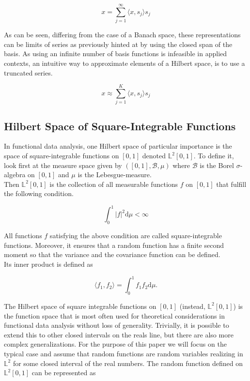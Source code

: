 \documentclass[11pt,twoside,a4paper]{article}
\begin{document}
	\begin{equation}
		x = \sum_{j = 1}^{\infty}{\langle x, s_j \rangle}s_j
	\end{equation}
	
	As can be seen, differing from the case of a Banach space, these representations can be limits of series as previously hinted at by using the closed span of the basis. As using an infinite number of basis functions is infeasible in applied contexts, an intuitive way to approximate elements of a Hilbert space, is to use a truncated series.
	
	\begin{equation}
		x \approx \sum_{j = 1}^{K}{\langle x, s_j \rangle}s_j
	\end{equation}
	
	\subsection{Hilbert Space of Square-Integrable Functions}
	In functional data analysis, one Hilbert space of particular importance is the space of square-integrable functions on $[0,1]$ denoted $\mathbb{L}^2[0,1]$. To define it, look first at the measure space given by $([0,1], \mathcal{B}, \mu)$ where $\mathcal{B}$ is the Borel $\sigma$-algebra on $[0,1]$ and $\mu$ is the Lebesgue-measure.\\
	Then $\mathbb{L}^2[0,1]$ is the collection of all measurable functions $f$ on $[0,1]$ that fulfill the following condition.
	
	\begin{equation}
		\int_{0}^{1} \lvert f \rvert^2 \mathrm{d}\mu < \infty
	\end{equation}
	
	All functions $f$ satisfying the above condition are called square-integrable functions. Moreover, it ensures that a random function has a finite second moment so that the variance and the covariance function can be defined.\\
	Its inner product is defined as
	
	\begin{equation}
		\langle f_1, f_2 \rangle = \int_{0}^{1} f_1 f_2 \mathrm{d}\mu.
	\end{equation}
	
	The Hilbert space of square integrable functions on $[0,1]$ {\color{orange} (instead, $\mathbb{L}^2[0,1]$)} is the function space that is most often used for theoretical considerations in functional data analysis  {\color{orange} without loss of generality}. Trivially, it is possible to extend this to other closed intervals on the reals line, but there are also more complex generalizations. For the purpose of this paper we will focus on the typical case and assume that random functions are random variables realizing in $\mathbb{L}^2$ for some closed interval of the real numbers. The random function defined on $\mathbb{L}^2[0,1]$ can be represented as
	
\end{document}
